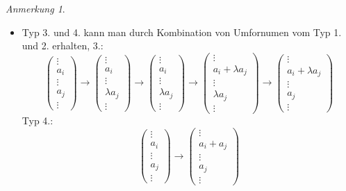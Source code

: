 \documentclass[a4paper]{scrartcl}
\theoremstyle{definition}
\theoremstyle{plain}
\theoremstyle{plain}
\theoremstyle{remark}
\theoremstyle{remark}
\newtheorem{note}{Anmerkung}
\theoremstyle{remark}
\theoremstyle{remark}
\theoremstyle{remark}
\begin{document}
\begin{note}
\mbox{}
\begin{itemize}
\item Typ 3. und 4. kann man durch Kombination von Umfornumen vom Typ 1. und 2. erhalten, 3.:
\begin{equation}
\begin{pmatrix} \vdots \\ a_i \\ \vdots \\ a_j \\ \vdots\end{pmatrix}
\to \begin{pmatrix} \vdots \\ a_i \\ \vdots \\ \lambda a_j  \\ \vdots \end{pmatrix}
\to \begin{pmatrix} \vdots \\ a_i \\ \vdots \\ \lambda a_j \\ \vdots\end{pmatrix}
\to \begin{pmatrix} \vdots \\ a_i + \lambda a_j \\ \vdots \\ \lambda a_j  \\ \vdots \end{pmatrix}
\to \begin{pmatrix} \vdots \\ a_i + \lambda a_j \\ \vdots \\ a_j  \\ \vdots \end{pmatrix}
\end{equation}
Typ 4.:
\begin{equation}
\begin{pmatrix} \vdots \\ a_i \\ \vdots \\ a_j \\ \vdots\end{pmatrix}
\to \begin{pmatrix} \vdots \\ a_i + a_j \\ \vdots \\ a_j  \\ \vdots \end{pmatrix}

\end{equation}
\end{itemize}
\end{note}
\end{document}
